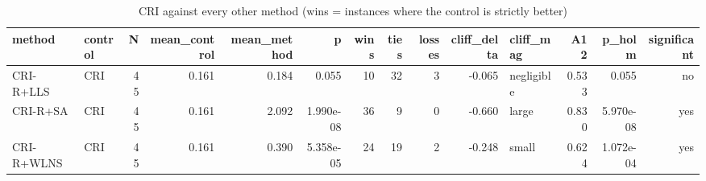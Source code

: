 \begin{table}[htbp]
\centering
\small
\caption{CRI against every other method (wins = instances where the control is strictly better)}
\label{tab:E5b_ablation_60s_b60_vs_CRI}
\begin{tabular}{llrrrrrrrrlrrr}
\toprule
method & control & N & mean\_control & mean\_method & p & wins & ties & losses & cliff\_delta & cliff\_mag & A12 & p\_holm & significant \\
\midrule
CRI-R+LLS & CRI & 45 & 0.161 & 0.184 & 0.055 & 10 & 32 & 3 & -0.065 & negligible & 0.533 & 0.055 & no \\
CRI-R+SA & CRI & 45 & 0.161 & 2.092 & 1.990e-08 & 36 & 9 & 0 & -0.660 & large & 0.830 & 5.970e-08 & yes \\
CRI-R+WLNS & CRI & 45 & 0.161 & 0.390 & 5.358e-05 & 24 & 19 & 2 & -0.248 & small & 0.624 & 1.072e-04 & yes \\
\bottomrule
\end{tabular}
\end{table}
